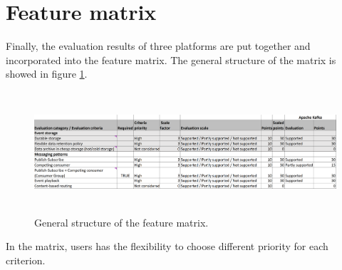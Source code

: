 \section{Feature matrix} 
Finally, the evaluation results of three platforms are put together and incorporated into the feature matrix. The general structure of the matrix is showed in figure \ref{fig:featurematrix}.

\begin{figure}[h]
	\begin{adjustwidth}{-1.5cm}{}
	\centering
	\includegraphics[width=18cm,height=4.5cm]{images/feature-matrix.png}
	\end{adjustwidth}
	\caption{General structure of the feature matrix.}
	\label{fig:featurematrix}
\end{figure}

In the matrix, users has the flexibility to choose different priority for each criterion. 